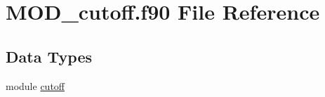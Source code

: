 \hypertarget{MOD__cutoff_8f90}{\section{M\-O\-D\-\_\-cutoff.\-f90 File Reference}
\label{MOD__cutoff_8f90}
}
\subsection*{Data Types}
\begin{DoxyCompactItemize}
\item 
module \hyperlink{classcutoff}{cutoff}
\end{DoxyCompactItemize}
